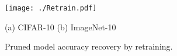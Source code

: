\documentclass{article} %
\begin{document}
\begin{figure}[t]
  \centering
  \texttt{[image: ./Retrain.pdf]}
  \vspace{-6mm}
  \caption*{\hspace{2mm}(a) CIFAR-10\hspace{50mm} (b) ImageNet-10}
  \caption{Pruned model accuracy recovery by retraining.}
  \label{fig:Retrain}
  \vspace{-2mm}
\end{figure}\begin{comment}
\begin{table}[t]
\caption{VGG on Cifar10 Pruning Configuration}
\centering
\begin{tabular}{llllllll}
\toprule
                 &        &         & base   & prune A & A-$\ell_1$ & prune B & B-$\ell_1$  \\
layer            & output & cluster & filter & filter  & filter     & filter  & filter    \\ \midrule
Conv1\_1         & 32x32  & 15      & 64     & 19      & 19         & 36      & 36      \\
Conv2\_1         & 16x16  & 20      & 128    & 8       & 8          & 38      & 38      \\
Conv3\_1         &  8x8   & 26      & 256    & 21      & 21         & 64      & 64      \\
Conv4\_1         &  4x4   & 27      & 512    & 146     & 146        & 329     & 329     \\
Conv5\_1         &  2x2   & 46      & 512    & 398     & 398      & 483     & 483     \\ \hline
p                &        &         &        & 0.5     & -        & 1       & -     \\
FLOPs (x$10^{8}$)&  3.13  &         &  -     & 1.85    & 1.85       & 1.03    & 1.03    \\
FLOPs reduction  &        &         &  -     & \textbf{41\%}    & 41\%      & \textbf{68\%}        & 68\%     \\
prune accuracy   &        &         &  -     & 88.1\%  & 82.4\%     & 72.1\%  & 60.2\%      \\
retrain accuracy &        &         & 90.2\%*& \textbf{90.3\%}  & 89.82\%     & \textbf{89.92\%}   & 89.73\%  \\ \bottomrule
\end{tabular}
\caption*{\hspace{-105mm}\footnotesize{*Baseline accuracy}}
\label{tab:VGG}
\end{table}



\end{comment}
\end{document}
